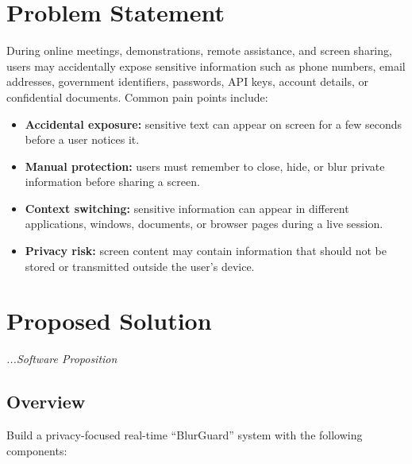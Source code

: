 \documentclass[12pt,a4paper]{article}
\begin{document}
\section{Problem Statement}

During online meetings, demonstrations, remote assistance, and screen sharing, users may accidentally expose sensitive information such as phone numbers, email addresses, government identifiers, passwords, API keys, account details, or confidential documents. Common pain points include:

\begin{itemize}
    \item \textbf{Accidental exposure:} sensitive text can appear on screen for a few seconds before a user notices it.

    \item \textbf{Manual protection:} users must remember to close, hide, or blur private information before sharing a screen.

    \item \textbf{Context switching:} sensitive information can appear in different applications, windows, documents, or browser pages during a live session.

    \item \textbf{Privacy risk:} screen content may contain information that should not be stored or transmitted outside the user's device.
\end{itemize}

\vfill
\newpage


\section{Proposed Solution}
\hfill{\itshape\fontsize{8.3}{9.5}\selectfont ...Software Proposition}

\subsection{Overview}

Build a privacy-focused real-time ``BlurGuard'' system with the following components:
\end{document}
